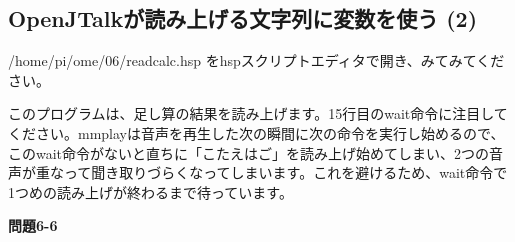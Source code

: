 \documentclass[a4paper,dvipdfmx]{jarticle}
\begin{document}
\subsection{OpenJTalkが読み上げる文字列に変数を使う
(2)}
{
/home/pi/ome/06/readcalc.hsp
をhspスクリプトエディタで開き、みてみてください。}

{
このプログラムは、足し算の結果を読み上げます。15行目のwait命令に注目してください。mmplayは音声を再生した次の瞬間に次の命令を実行し始めるので、このwait命令がないと直ちに「こたえはご」を読み上げ始めてしまい、2つの音声が重なって聞き取りづらくなってしまいます。これを避けるため、wait命令で1つめの読み上げが終わるまで待っています。}

{\bfseries
問題6-6}

\centering
\end{document}
